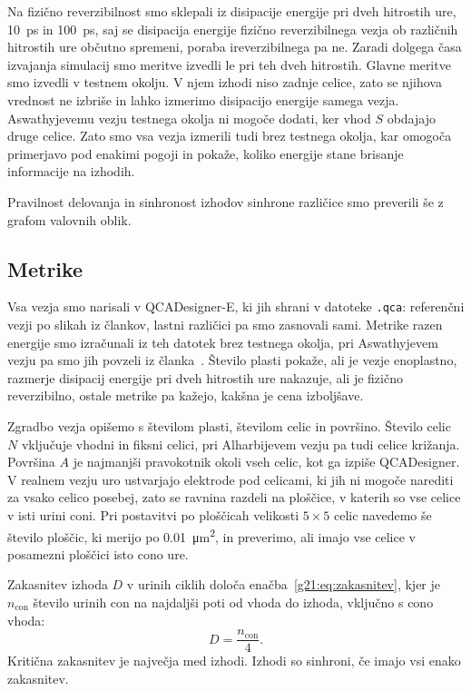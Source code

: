 \documentclass[graybox, envcountchap]{svmult}
\begin{document}
Na fizično reverzibilnost smo sklepali iz disipacije energije pri dveh hitrostih ure, \SI{10}{\pico\second} in \SI{100}{\pico\second}, saj se disipacija energije fizično reverzibilnega vezja ob različnih hitrostih ure občutno spremeni, poraba ireverzibilnega pa ne. Zaradi dolgega časa izvajanja simulacij smo meritve izvedli le pri teh dveh hitrostih. Glavne meritve smo izvedli v testnem okolju. V njem izhodi niso zadnje celice, zato se njihova vrednost ne izbriše in lahko izmerimo disipacijo energije samega vezja. Aswathyjevemu vezju testnega okolja ni mogoče dodati, ker vhod $S$ obdajajo druge celice. Zato smo vsa vezja izmerili tudi brez testnega okolja, kar omogoča primerjavo pod enakimi pogoji in pokaže, koliko energije stane brisanje informacije na izhodih.

Pravilnost delovanja in sinhronost izhodov sinhrone različice smo preverili še z grafom valovnih oblik.

\subsection{Metrike}
\label{g21:sec:metrike}

Vsa vezja smo narisali v QCADesigner-E, ki jih shrani v datoteke \texttt{.qca}: referenčni vezji po slikah iz člankov, lastni različici pa smo zasnovali sami. Metrike razen energije smo izračunali iz teh datotek brez testnega okolja, pri Aswathyjevem vezju pa smo jih povzeli iz članka~\cite{aswathy2024}. Število plasti pokaže, ali je vezje enoplastno, razmerje disipacij energije pri dveh hitrostih ure nakazuje, ali je fizično reverzibilno, ostale metrike pa kažejo, kakšna je cena izboljšave.

Zgradbo vezja opišemo s številom plasti, številom celic in površino. Število celic $N$ vključuje vhodni in fiksni celici, pri Alharbijevem vezju pa tudi celice križanja. Površina $A$ je najmanjši pravokotnik okoli vseh celic, kot ga izpiše QCADesigner. V realnem vezju uro ustvarjajo elektrode pod celicami, ki jih ni mogoče narediti za vsako celico posebej, zato se ravnina razdeli na ploščice, v katerih so vse celice v isti urini coni. Pri postavitvi po ploščicah velikosti $5\times5$ celic navedemo še število ploščic, ki merijo po \SI{0.01}{\micro\metre\squared}, in preverimo, ali imajo vse celice v posamezni ploščici isto cono ure.

Zakasnitev izhoda $D$ v urinih ciklih določa enačba~\eqref{g21:eq:zakasnitev}, kjer je $n_\mathrm{con}$ število urinih con na najdaljši poti od vhoda do izhoda, vključno s cono vhoda:
\begin{equation}
D = \frac{n_\mathrm{con}}{4}.
\label{g21:eq:zakasnitev}
\end{equation}
Kritična zakasnitev je največja med izhodi. Izhodi so sinhroni, če imajo vsi enako zakasnitev.
\end{document}
